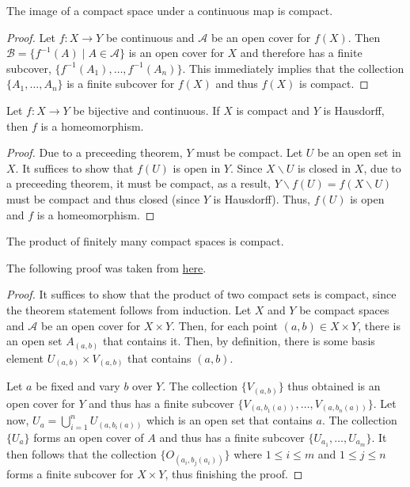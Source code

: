 \begin{theorem}
    The image of a compact space under a continuous map is compact.
\end{theorem}
\begin{proof}
    Let $f:X\to Y$ be continuous and $\mathscr{A}$ be an open cover for $f(X)$. Then $\mathscr{B} = \{f^{-1}(A)\mid A\in\mathscr{A}\}$ is an open cover for $X$ and therefore has a finite subcover, $\{f^{-1}(A_1),\ldots,f^{-1}(A_n)\}$. This immediately implies that the collection $\{A_1,\ldots,A_n\}$ is a finite subcover for $f(X)$ and thus $f(X)$ is compact.
\end{proof}

\begin{theorem}
    Let $f:X\to Y$ be bijective and continuous. If $X$ is compact and $Y$ is Hausdorff, then $f$ is a homeomorphism.
\end{theorem}
\begin{proof}
    Due to a preceeding theorem, $Y$ must be compact. Let $U$ be an open set in $X$. It suffices to show that $f(U)$ is open in $Y$. Since $X\backslash U$ is closed in $X$, due to a preceeding theorem, it must be compact, as a result, $Y\backslash f(U) = f(X\backslash U)$ must be compact and thus closed (since $Y$ is Hausdorff). Thus, $f(U)$ is open and $f$ is a homeomorphism.
\end{proof}

\begin{theorem}
    The product of finitely many compact spaces is compact.
\end{theorem}
The following proof was taken from \href{https://math.stackexchange.com/a/980487}{here}.
\begin{proof}
    It suffices to show that the product of two compact sets is compact, since the theorem statement follows from induction. Let $X$ and $Y$ be compact spaces and $\mathscr{A}$ be an open cover for $X\times Y$. Then, for each point $(a,b)\in X\times Y$, there is an open set $A_{(a,b)}$ that contains it. Then, by definition, there is some basis element $U_{(a,b)}\times V_{(a,b)}$ that contains $(a,b)$. 

    Let $a$ be fixed and vary $b$ over $Y$. The collection $\{V_{(a,b)}\}$ thus obtained is an open cover for $Y$ and thus has a finite subcover $\{V_{(a,b_1(a))},\ldots,V_{(a,b_n(a))}\}$. Let now, $U_a = \bigcup_{i=1}^n U_{(a,b_i(a))}$ which is an open set that contains $a$. The collection $\{U_a\}$ forms an open cover of $A$ and thus has a finite subcover $\{U_{a_1},\ldots,U_{a_m}\}$. It then follows that the collection $\{O_{(a_i, b_j(a_i))}\}$ where $1\le i\le m$ and $1\le j\le n$ forms a finite subcover for $X\times Y$, thus finishing the proof.
\end{proof}

